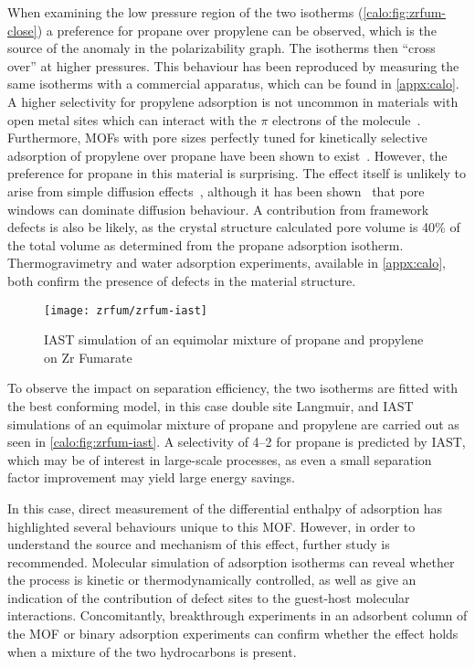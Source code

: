 When examining the low pressure region of the two isotherms 
(\autoref{calo:fig:zrfum-close}) a preference for propane over
propylene can be observed, which is the source of the anomaly
in the polarizability graph. The isotherms then ``cross over'' 
at higher pressures.
This behaviour has been reproduced by measuring the same 
isotherms with a commercial apparatus, which can be found 
in \autoref{appx:calo}.
A higher selectivity for propylene adsorption is not uncommon
in materials with open metal sites which can interact with 
the \(\pi\) electrons of the 
molecule~\cite{rubesAdsorptionPropanePropylene2013}.
Furthermore, MOFs with pore sizes perfectly tuned for kinetically
selective adsorption of propylene over propane have been shown 
to exist~\cite{leeKineticSeparationPropene2011}. However,
the preference for propane in this material is surprising.
The effect itself is unlikely to arise from simple diffusion
effects~\cite{granatoDiffusionPropanePropylene2010}, although
it has been shown~\cite{combarizaPropanePropyleneDiffusion2009}
that pore windows can dominate diffusion behaviour. A contribution
from framework defects is also be likely, as the 
crystal structure calculated pore volume is 40\% of the total
volume as determined from the propane adsorption isotherm.
Thermogravimetry and water adsorption experiments, available in 
\autoref{appx:calo}, both confirm the presence of defects in the 
material structure.

\begin{figure}[htb]
    \centering
    \texttt{[image: zrfum/zrfum-iast]}
    \caption{IAST simulation of an equimolar mixture of 
    propane and propylene on Zr Fumarate}%
    \label{calo:fig:zrfum-iast}

\end{figure}

To observe the impact on separation efficiency, the two isotherms 
are fitted with the best conforming model, in this case
double site Langmuir, and IAST simulations of an equimolar mixture
of propane and propylene are carried out as seen in 
\autoref{calo:fig:zrfum-iast}. A selectivity of 4--2 for 
propane is predicted by IAST, which may be of interest in 
large-scale processes, as even a small separation factor 
improvement may yield large energy savings.

In this case, direct measurement of the differential enthalpy of 
adsorption has highlighted several behaviours unique to this 
MOF. However, in order to understand the source and mechanism
of this effect, further study is recommended. Molecular 
simulation of adsorption isotherms can reveal whether 
the process is kinetic or thermodynamically controlled, as well
as give an indication of the contribution of defect sites to the
guest-host molecular interactions.
Concomitantly, breakthrough experiments in an adsorbent column of 
the MOF or binary adsorption experiments can confirm whether the 
effect holds when a mixture of the two hydrocarbons is present.